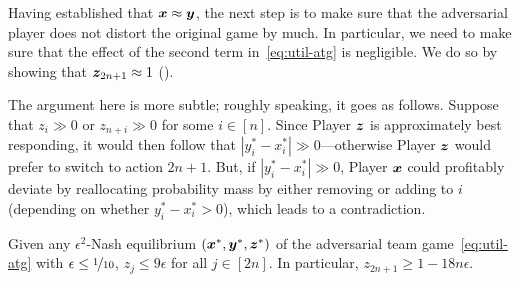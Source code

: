 Having established that ${\bm{x}} \approx {\bm{y}}$, the next step is to make sure that the adversarial player does not distort the original game by much. In particular, we need to make sure that the effect of the second term in~\eqref{eq:util-atg} is negligible. We do so by showing that ${\bm{z}}_{2n+1} \approx 1$ ().

The argument here is more subtle; roughly speaking, it goes as follows. Suppose that $z_{i} \gg 0$ or $z_{n+i} \gg 0$ for some $i \in [n]$. Since Player ${\bm{z}}$ is approximately best responding, it would then follow that $|y_i^* - x_i^*| \gg 0$---otherwise Player ${\bm{z}}$ would prefer to switch to action $2n+1$. But, if $|y_i^* - x^*_i| \gg 0$, Player ${\bm{x}}$ could profitably deviate by reallocating probability mass by either removing or adding to $i$ (depending on whether $y_i^* - x_i^* > 0$), which leads to a contradiction.

\begin{lemma} \label{lemma:small_z}
    Given any $\epsilon^2$-Nash equilibrium $({\bm{x}}^*, {\bm{y}}^*, {\bm{z}}^*)$ of the adversarial team game~\eqref{eq:util-atg} with $\epsilon \leq \nicefrac{1}{10}$, $z_j \leq 9 \epsilon$ for all $j \in [2n]$. In particular, $z_{2n+1} \geq 1 - 18 n \epsilon$.
\end{lemma}


